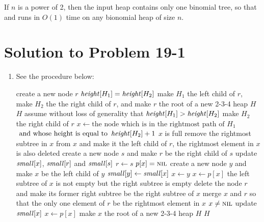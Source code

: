 \documentclass[a4paper, fleqn]{article}
\begin{document}
If $n$ is a power of 2, then the input heap contains only one binomial
tree, so that  and
 runs in $O(1)$ time on any bionomial
heap of size $n$.






\section*{Solution to Problem 19-1}

\begin{enumerate}
\renewcommand{\labelenumi}{\itshape \bfseries \alph{enumi}.}

\item  %

See the  procedure below:

\begin{codebox}
\li create a new node $r$
\li \If $\id{height}[H_1] = \id{height}[H_2]$
\li     \Then
            make $H_1$ the left child of $r$, make $H_2$ the
\zi         the right child of $r$, and make $r$ the root of
\zi         a new 2-3-4 heap $H$
\li         \Return $H$
        \End
\li assume without loss of generality that
    $\id{height}[H_1] > \id{height}[H_2]$
\li make $H_2$ the right child of $r$
\li $x \gets \mbox{the node which is in the rightmost path of } H_1$
\zi \>$\mbox{ and whose height is equal to } \id{height}[H_2] + 1$
\li \While $x$ is full
\li     \Do
            remove the rightmost subtree in $x$ from $x$ and
\zi         \>make it the left child of $r$, the rightmost element
\zi         \>in $x$ is also deleted
\li         create a new node $s$ and make $r$ be
\zi         \>the right child of $s$
\li         update $\id{small}[x]$, $\id{small}[r]$ and
              $\id{small}[s]$
\li         $r \gets s$
\li         \If $p[x] = \textnormal{\scshape nil}$
\li             \Then
                    create a new node $y$ and
\zi                 \>make $x$ be the left child of $y$
\li                 $\id{small}[y] \gets \id{small}[x]$
\li                 $x \gets y$
                \End
\li         $x \gets p[x]$
        \End  %
\li \If the left subtree of $x$ is not empty but
\zi     \>the right subtree is empty
\li     \Then
            delete the node $r$ and make its former right subtree
\zi         \>be the right subtree of $x$
\li     \Else
            merge $x$ and $r$ so that the only one element of $r$
\zi         \>be the rightmost element in $x$
        \End
\li \While $x \neq \textnormal{\scshape nil}$
\li     \Do
            update $\id{small}[x]$
\li         $x \gets p[x]$
        \End
\li make $x$ the root of a new 2-3-4 heap $H$
\li \Return $H$
\end{codebox}

\end{enumerate}
\end{document}
